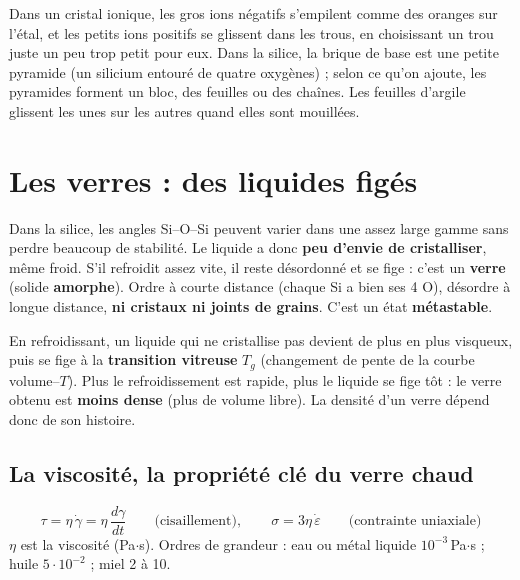 \begin{goatbox}
Dans un cristal ionique, les gros ions négatifs s'empilent comme des oranges sur l'étal, et les
petits ions positifs se glissent dans les trous, en choisissant un trou juste un peu trop petit
pour eux. Dans la silice, la brique de base est une petite pyramide (un silicium entouré de
quatre oxygènes) ; selon ce qu'on ajoute, les pyramides forment un bloc, des feuilles ou des
chaînes. Les feuilles d'argile glissent les unes sur les autres quand elles sont mouillées.
\end{goatbox}

\section{Les verres : des liquides figés}


Dans la silice, les angles Si--O--Si peuvent varier dans une assez large gamme sans perdre
beaucoup de stabilité. Le liquide a donc \textbf{peu d'envie de cristalliser}, même froid. S'il
refroidit assez vite, il reste désordonné et se fige : c'est un \textbf{verre} (solide
\textbf{amorphe}). Ordre à courte distance (chaque Si a bien ses 4 O), désordre à longue
distance, \textbf{ni cristaux ni joints de grains}. C'est un état \textbf{métastable}.


\begin{propbox}[title=La température de transition vitreuse $T_g$]
En refroidissant, un liquide qui ne cristallise pas devient de plus en plus visqueux, puis se
fige à la \textbf{transition vitreuse} $T_g$ (changement de pente de la courbe volume--$T$). Plus
le refroidissement est rapide, plus le liquide se fige tôt : le verre obtenu est \textbf{moins
dense} (plus de volume libre). La densité d'un verre dépend donc de son histoire.
\end{propbox}

\subsection*{La viscosité, la propriété clé du verre chaud}

\begin{defnbox}[title={Fluide newtonien et viscosité (à connaître par c\oe ur)}]
\[ \tau = \eta\,\dot\gamma = \eta\,\frac{d\gamma}{dt}
   \qquad\text{(cisaillement)}, \qquad
   \sigma = 3\eta\,\dot\varepsilon \qquad\text{(contrainte uniaxiale)} \]
$\eta$ est la viscosité (Pa$\cdot$s). Ordres de grandeur : eau ou métal liquide
$10^{-3}$\,Pa$\cdot$s ; huile $5\cdot10^{-2}$ ; miel 2 à 10.
\end{defnbox}

